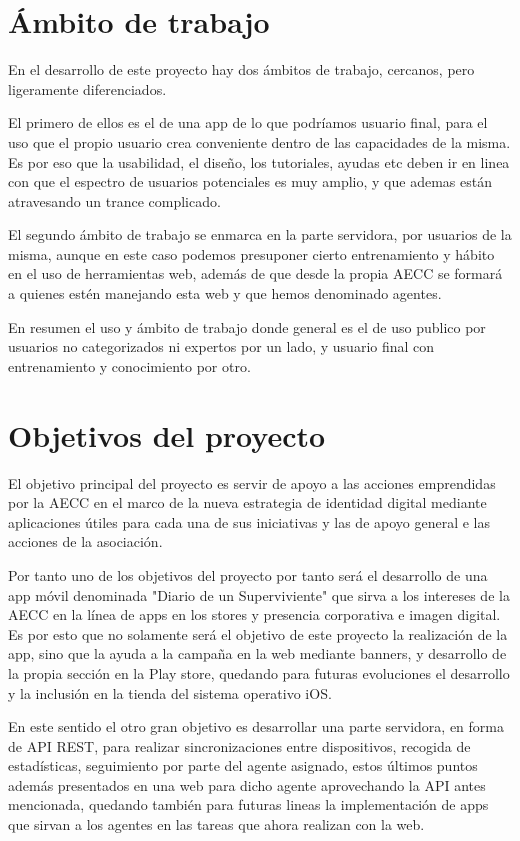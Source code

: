 \documentclass[../pfc.tex]{subfiles}
\begin{document}
\section{Ámbito de trabajo}

En el desarrollo de este proyecto hay dos ámbitos de trabajo, cercanos, pero ligeramente diferenciados.

El primero de ellos es el de una app de lo que podríamos usuario final, para el uso que el propio usuario crea conveniente dentro de las capacidades de la misma. Es por eso que la usabilidad, el diseño, los tutoriales, ayudas etc deben ir en linea con que el espectro de usuarios potenciales es muy amplio, y que ademas están atravesando un trance complicado.

El segundo ámbito de trabajo se enmarca en la parte servidora, por usuarios de la misma, aunque en este caso podemos presuponer cierto entrenamiento y hábito en el uso de herramientas web, además de que desde la propia AECC se formará a quienes estén manejando esta web y que hemos denominado agentes.

En resumen el uso y ámbito de trabajo donde general es el de uso publico por usuarios no categorizados ni expertos por un lado, y usuario final con entrenamiento y conocimiento por otro.

\section{Objetivos del proyecto}
El objetivo principal del proyecto es servir de apoyo a las acciones emprendidas por la AECC en el marco de la nueva estrategia de identidad digital mediante aplicaciones útiles para cada una de sus iniciativas y las de apoyo general e las acciones de la asociación.

Por tanto uno de los objetivos del proyecto por tanto será el desarrollo de una app móvil denominada "Diario de un Superviviente" que sirva a los intereses de la AECC en la línea de apps en los stores y presencia corporativa e imagen digital. Es por esto que no solamente será el objetivo de este proyecto la realización de la app, sino que la ayuda a la campaña en la web mediante banners, y desarrollo de la propia sección en la Play store, quedando para futuras evoluciones el desarrollo y la inclusión en la tienda del sistema operativo iOS.

En este sentido el otro gran objetivo es desarrollar una parte servidora, en forma de API REST, para realizar sincronizaciones entre dispositivos, recogida de estadísticas, seguimiento por parte del agente asignado, estos últimos puntos además presentados en una web para dicho agente aprovechando la API antes mencionada, quedando también para futuras lineas la implementación de apps que sirvan a los agentes en las tareas que ahora realizan con la web.
\end{document}
